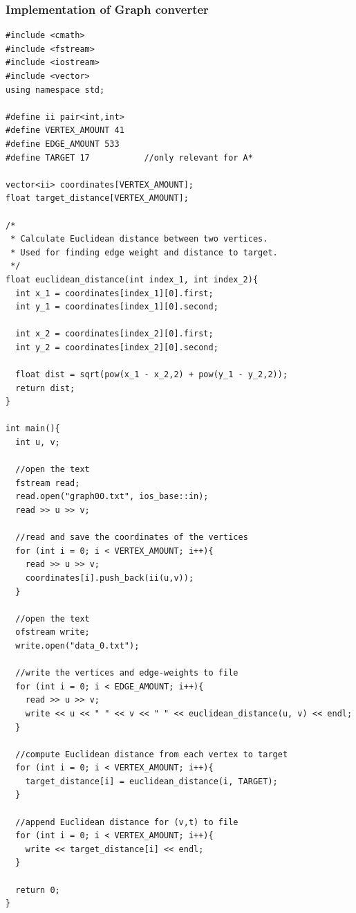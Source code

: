 \documentclass[11pt]{article}
\begin{document}
\subsubsection{Implementation of Graph converter}
\begin{lstlisting}
#include <cmath>
#include <fstream>
#include <iostream>
#include <vector>
using namespace std;

#define ii pair<int,int>
#define VERTEX_AMOUNT 41  
#define EDGE_AMOUNT 533
#define TARGET 17           //only relevant for A*

vector<ii> coordinates[VERTEX_AMOUNT];
float target_distance[VERTEX_AMOUNT];

/* 
 * Calculate Euclidean distance between two vertices.
 * Used for finding edge weight and distance to target.
 */
float euclidean_distance(int index_1, int index_2){
  int x_1 = coordinates[index_1][0].first;
  int y_1 = coordinates[index_1][0].second;
	
  int x_2 = coordinates[index_2][0].first;
  int y_2 = coordinates[index_2][0].second;

  float dist = sqrt(pow(x_1 - x_2,2) + pow(y_1 - y_2,2)); 
  return dist;
}

int main(){
  int u, v;

  //open the text
  fstream read;
  read.open("graph00.txt", ios_base::in);
  read >> u >> v;
	
  //read and save the coordinates of the vertices
  for (int i = 0; i < VERTEX_AMOUNT; i++){
    read >> u >> v;
    coordinates[i].push_back(ii(u,v));
  }

  //open the text
  ofstream write;
  write.open("data_0.txt");
	
  //write the vertices and edge-weights to file
  for (int i = 0; i < EDGE_AMOUNT; i++){
    read >> u >> v;
    write << u << " " << v << " " << euclidean_distance(u, v) << endl;
  }

  //compute Euclidean distance from each vertex to target
  for (int i = 0; i < VERTEX_AMOUNT; i++){
    target_distance[i] = euclidean_distance(i, TARGET);
  }
	
  //append Euclidean distance for (v,t) to file
  for (int i = 0; i < VERTEX_AMOUNT; i++){
    write << target_distance[i] << endl; 
  }

  return 0;
}
\end{lstlisting}
\ \\
\end{document}
